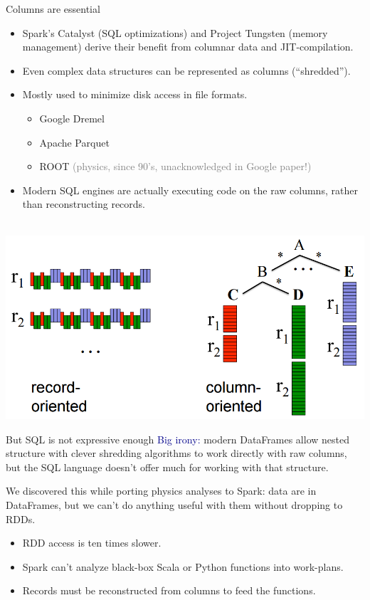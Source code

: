 \documentclass{beamer}
\begin{document}
\begin{frame}{Columns are essential}
\vspace{-1.5 cm}
\begin{itemize}\setlength{\itemsep}{0.25 cm}
\item Spark's Catalyst (SQL optimizations) and Project Tungsten (memory management) derive their benefit from columnar data and JIT-compilation.
\item \begin{minipage}[t]{0.5\linewidth}Even complex data structures can be represented as columns (``shredded'').\end{minipage}
\item \begin{minipage}[t]{0.5\linewidth}Mostly used to minimize disk access in file formats.\end{minipage}

\vspace{0.1 cm}
\begin{itemize}
\item Google Dremel
\item Apache Parquet
\item ROOT \textcolor{gray}{(physics, since 90's, unacknowledged in Google paper!)}
\end{itemize}

\item Modern SQL engines are actually executing code on the raw columns, rather than reconstructing records.
\end{itemize}

\vspace{-5 cm}
\mbox{ } \hfill \includegraphics[width=0.4\linewidth]{columnar.png}
\end{frame}

\begin{frame}{But SQL is not expressive enough}
\vspace{0.5 cm}
\textcolor{darkblue}{Big irony:} modern DataFrames allow nested structure with clever shredding algorithms to work directly with raw columns, but the SQL language doesn't offer much for working with that structure.

\vspace{0.5 cm}
We discovered this while porting physics analyses to Spark: data are in DataFrames, but we can't do anything useful with them without dropping to RDDs.

\vspace{0.5 cm}
\begin{itemize}
\item RDD access is ten times slower.
\item Spark can't analyze black-box Scala or Python functions into work-plans.
\item Records must be reconstructed from columns to feed the functions.
\end{itemize}
\end{frame}
\end{document}
